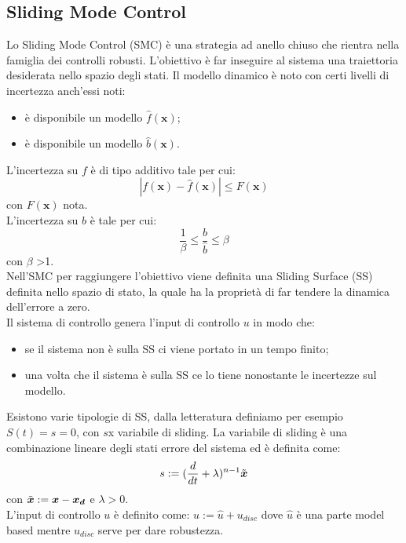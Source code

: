 \subsection{Sliding Mode Control} \label{SMC_Theory}
Lo Sliding Mode Control (SMC) \cite{SMCOriginal} è una strategia ad anello chiuso che rientra nella famiglia dei controlli robusti. L'obiettivo è far inseguire al sistema una traiettoria desiderata nello spazio degli stati. Il modello dinamico è noto con certi livelli di incertezza anch'essi noti:
\begin{itemize}
    \item è disponibile un modello $\hat{f}(\boldsymbol {x})$;
    \item è disponibile un modello $\hat{b}(\boldsymbol {x})$.
\end{itemize}
L'incertezza su $f$ è di tipo additivo tale per cui:
\begin{equation}
|f(\boldsymbol {x})-\hat{f}(\boldsymbol {x})|\leq F(\boldsymbol {x})
\end{equation}
con $F(\boldsymbol {x})$ nota. \\
L'incertezza su $b$ è tale per cui:
\begin{equation}
\frac{1}{\beta} \leq \frac{b}{\hat{b}}\leq \beta
\end{equation}
con $\beta$ >1.
\\
Nell'SMC per raggiungere l'obiettivo viene definita una Sliding Surface (SS) definita nello spazio di stato, la quale ha la proprietà di far tendere la dinamica dell'errore a zero. \\ Il sistema di controllo genera l'input di controllo $u$ in modo che:
\begin{itemize}
    \item se il sistema non è sulla SS ci viene portato in un tempo finito;
    \item una volta che il sistema è sulla SS ce lo tiene nonostante le incertezze sul modello.
\end{itemize}
Esistono varie tipologie di SS, dalla letteratura definiamo per esempio $S(t)=s=0$, con $s$x variabile di sliding. La variabile di sliding è una combinazione lineare degli stati errore del sistema ed è definita come:
\begin{equation}
s:=(\frac{d}{dt}+\lambda)^{n-1}\Tilde{\boldsymbol {x}}
\end{equation}
con $\Tilde{\boldsymbol {x}}:=\boldsymbol {x}-\boldsymbol {x_d}$ e $\lambda>0$.
\\
L'input di controllo $u$ è definito come: $u:=\hat{u}+u_{disc}$ dove $\hat{u}$ è una parte model based mentre $u_{disc}$ serve per dare robustezza. \\
